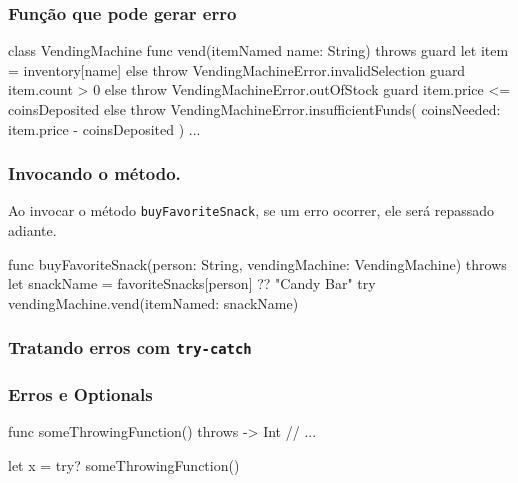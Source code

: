 \begin{frame}[fragile]
    \frametitle{Função que pode gerar erro}
    \begin{swift}
class VendingMachine {
    func vend(itemNamed name: String) throws {
        guard let item = inventory[name] else
        { throw VendingMachineError.invalidSelection }
        guard item.count > 0 else
        { throw VendingMachineError.outOfStock }
        guard item.price <= coinsDeposited else {
            throw VendingMachineError.insufficientFunds(
                        coinsNeeded: item.price - coinsDeposited
                    )
        }
        ...
    }
}
    \end{swift}
\end{frame}

\begin{frame}[fragile]
    \frametitle{Invocando o método.}
    Ao invocar o método \texttt{buyFavoriteSnack}, se um erro ocorrer,
    ele será repassado adiante.

    \begin{swift}
    func buyFavoriteSnack(person: String,
                          vendingMachine: VendingMachine) throws
    {
        let snackName = favoriteSnacks[person] ?? "Candy Bar"
        try vendingMachine.vend(itemNamed: snackName)
    }
    \end{swift}
\end{frame}

\begin{frame}[fragile]
    \frametitle{Tratando erros com \texttt{try-catch}}
\end{frame}

\begin{frame}[fragile]
    \frametitle{Erros e Optionals}

    \begin{swift}
    func someThrowingFunction() throws -> Int {
        // ...
    }

    let x = try? someThrowingFunction()
    \end{swift}

\end{frame}

